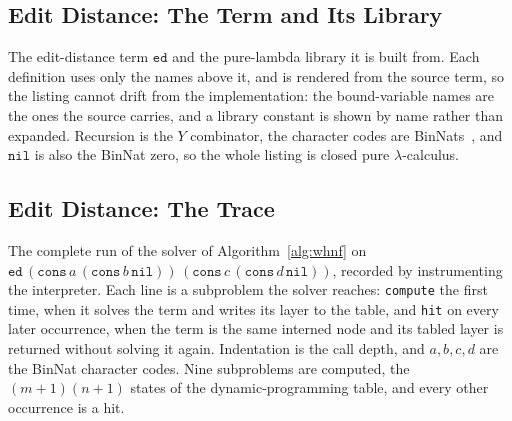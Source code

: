 \subsection{Edit Distance: The Term and Its Library}\label{app:editdistance-code}
The edit-distance term $\mathtt{ed}$ and the pure-lambda library it is built from. Each definition uses only the names above it, and is rendered from the source term, so the listing cannot drift from the implementation: the bound-variable names are the ones the source carries, and a library constant is shown by name rather than expanded. Recursion is the $Y$ combinator, the character codes are BinNats~\cite{mogensen1992-self-interpretation}, and $\mathtt{nil}$ is also the BinNat zero, so the whole listing is closed pure $\lambda$-calculus.


\subsection{Edit Distance: The Trace}\label{app:editdistance-trace}
The complete run of the solver of Algorithm~\ref{alg:whnf} on $\mathtt{ed}\,(\mathtt{cons}\,a\,(\mathtt{cons}\,b\,\mathtt{nil}))\,(\mathtt{cons}\,c\,(\mathtt{cons}\,d\,\mathtt{nil}))$, recorded by instrumenting the interpreter. Each line is a subproblem the solver reaches: \texttt{compute} the first time, when it solves the term and writes its layer to the table, and \texttt{hit} on every later occurrence, when the term is the same interned node and its tabled layer is returned without solving it again. Indentation is the call depth, and $a,b,c,d$ are the BinNat character codes. Nine subproblems are computed, the $(m{+}1)(n{+}1)$ states of the dynamic-programming table, and every other occurrence is a hit.


